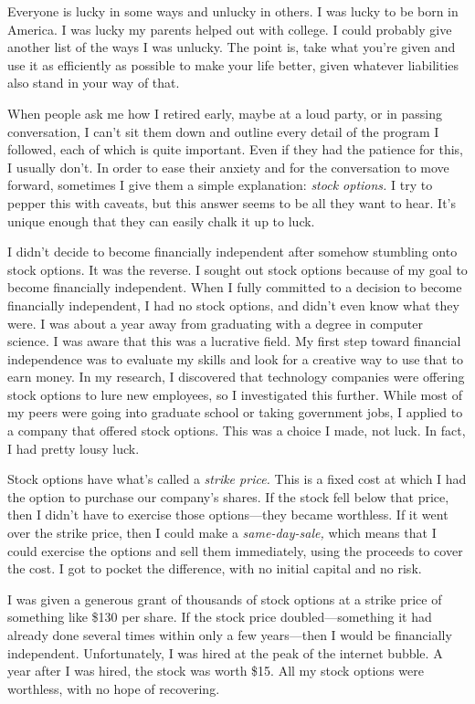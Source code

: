 Everyone is lucky in some ways and unlucky in others. I was lucky to be born in America. I was lucky my parents helped out with college. I could probably give another list of the ways I was unlucky. The point is, take what you're given and use it as efficiently as possible to make your life better, given whatever liabilities also stand in your way of that.

When people ask me how I retired early, maybe at a loud party, or in passing conversation, I can't sit them down and outline every detail of the program I followed, each of which is quite important. Even if they had the patience for this, I usually don't. In order to ease their anxiety and for the conversation to move forward, sometimes I give them a simple explanation: \emph{stock options.} I try to pepper this with caveats, but this answer seems to be all they want to hear. It's unique enough that they can easily chalk it up to luck.

I didn't decide to become financially independent after somehow stumbling onto stock options. It was the reverse. I sought out stock options because of my goal to become financially independent. When I fully committed to a decision to become financially independent, I had no stock options, and didn't even know what they were. I was about a year away from graduating with a degree in computer science. I was aware that this was a lucrative field. My first step toward financial independence was to evaluate my skills and look for a creative way to use that to earn money. In my research, I discovered that technology companies were offering stock options to lure new employees, so I investigated this further. While most of my peers were going into graduate school or taking government jobs, I applied to a company that offered stock options. This was a choice I made, not luck. In fact, I had pretty lousy luck.

Stock options have what's called a \emph{strike price.} This is a fixed cost at which I had the option to purchase our company's shares. If the stock fell below that price, then I didn't have to exercise those options---they became worthless. If it went over the strike price, then I could make a \emph{same-day-sale,} which means that I could exercise the options and sell them immediately, using the proceeds to cover the cost. I got to pocket the difference, with no initial capital and no risk.

I was given a generous grant of thousands of stock options at a strike price of something like \$130 per share. If the stock price doubled---something it had already done several times within only a few years---then I would be financially independent. Unfortunately, I was hired at the peak of the internet bubble. A year after I was hired, the stock was worth \$15. All my stock options were worthless, with no hope of recovering.

